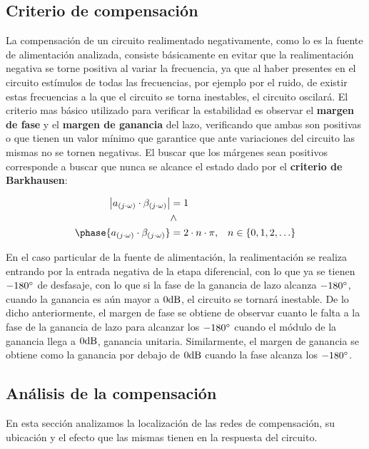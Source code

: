 
\subsection{Criterio de compensación}

La compensación de un circuito realimentado negativamente, como lo es la fuente de alimentación analizada, consiste básicamente en evitar que la realimentación negativa se torne positiva al variar la frecuencia, ya que al haber presentes en el circuito estímulos de todas las frecuencias, por ejemplo por el ruido, de existir estas frecuencias a la que el circuito se torna inestables, el circuito oscilará. El criterio mas básico utilizado para verificar la estabilidad es observar el \textbf{margen de fase} y el \textbf{margen de ganancia} del lazo, verificando que ambas son positivas o que tienen un valor mínimo que garantice que ante variaciones del circuito las mismas no se tornen negativas. El buscar que los márgenes sean positivos corresponde a buscar que nunca se alcance el estado dado por el \textbf{criterio de Barkhausen}:

\begin{align}
\begin{split}
\left| a_{(j \cdot \omega)} \cdot \beta_{(j \cdot \omega)} \right| &= 1 \\
& \land \\
\phase{a_{(j \cdot \omega)} \cdot \beta_{(j \cdot \omega)}} &= 2 \cdot n \cdot \pi,\;\;\; n \in \left \{  0, 1, 2, \ldots \right \} 
\end{split} 
\end{align}


En el caso particular de la fuente de alimentación, la realimentación se realiza entrando por la entrada negativa de la etapa diferencial, con lo que ya se tienen $-180 \si[per-mode=symbol]{\degree}$ de desfasaje, con lo que si la fase de la ganancia de lazo alcanza $-180 \si[per-mode=symbol]{\degree}$, cuando la ganancia es aún mayor a $0 \si[per-mode=symbol]{\decibel}$, el circuito se tornará inestable. De lo dicho anteriormente, el margen de fase se obtiene de observar cuanto le falta a la fase de la ganancia de lazo para alcanzar los $-180 \si[per-mode=symbol]{\degree}$  cuando el módulo de la ganancia llega a $0 \si[per-mode=symbol]{\decibel}$, ganancia unitaria. Similarmente, el margen de ganancia se obtiene como la ganancia por debajo de $0 \si[per-mode=symbol]{\decibel}$ cuando la fase alcanza los $-180 \si[per-mode=symbol]{\degree}$.


\subsection{Análisis de la compensación}

En esta sección analizamos la localización de las redes de compensación, su ubicación y el efecto que las mismas tienen en la respuesta del circuito.






